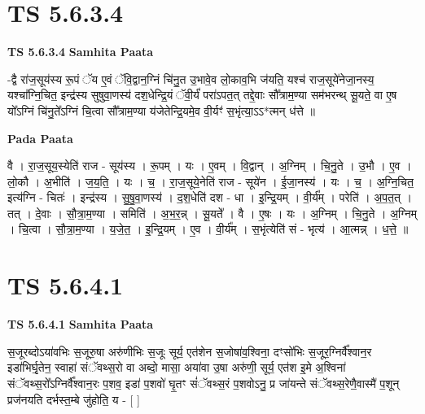 \documentclass[17pt]{extarticle}
\begin{document}

\section{ TS 5.6.3.4 }

\textbf{TS 5.6.3.4 } \newline
\textbf{Samhita Paata} \newline

-द्वै रा॑ज॒सूय॑स्य रू॒पं ॅय ए॒वं ॅवि॒द्वान॒ग्निं चि॑नु॒त उ॒भावे॒व लो॒काव॒भि ज॑यति॒ यश्च॑ राज॒सूये॑नेजा॒नस्य॒ यश्चा᳚ग्नि॒चित॒ इन्द्र॑स्य सुषुवा॒णस्य॑ दश॒धेन्द्रि॒यं ॅवी॒र्यं॑ परा॑ऽपत॒त् तद्दे॒वाः सौ᳚त्राम॒ण्या सम॑भरन्थ् सू॒यते॒ वा ए॒ष यो᳚ऽग्निं चि॑नु॒ते᳚ऽग्निं चि॒त्वा सौ᳚त्राम॒ण्या य॑जेतेन्द्रि॒यमे॒व वी॒र्यꣳ॑ स॒भृंत्या॒ऽऽ*त्मन् ध॑त्ते ॥ \newline

\textbf{Pada Paata} \newline

वै । रा॒ज॒सूय॒स्येति॑ राज - सूय॑स्य । रू॒पम् । यः । ए॒वम् । वि॒द्वान् । अ॒ग्निम् । चि॒नु॒ते । उ॒भौ । ए॒व ।   लो॒कौ । अ॒भीति॑ । ज॒य॒ति॒ । यः । च॒ । रा॒ज॒सूये॒नेति॑ राज - सूये॑न । ई॒जा॒नस्य॑ । यः । च॒ । अ॒ग्नि॒चित॒ इत्य॑ग्नि - चितः॑ । इन्द्र॑स्य । सु॒षु॒वा॒णस्य॑ । द॒श॒धेति॑ दश - धा । इ॒न्द्रि॒यम् । वी॒र्य᳚म् । परेति॑ । अ॒प॒त॒त् । तत् । दे॒वाः । सौ॒त्रा॒म॒ण्या । समिति॑ । अ॒भ॒र॒न्न् । सू॒यते᳚ । वै । ए॒षः । यः । अ॒ग्निम् । चि॒नु॒ते । अ॒ग्निम् । चि॒त्वा । सौ॒त्रा॒म॒ण्या । य॒जे॒त॒ । इ॒न्द्रि॒यम् । ए॒व । वी॒र्य᳚म् । स॒भृंत्येति॑ सं - भृत्य॑ । आ॒त्मन्न् । ध॒त्ते॒ ॥  \newline





\section{ TS 5.6.4.1 }

\textbf{TS 5.6.4.1 } \newline
\textbf{Samhita Paata} \newline

स॒जूरब्दोऽया॑वभिः स॒जूरु॒षा अरु॑णीभिः स॒जूः सूर्य॒ एत॑शेन स॒जोषा॑व॒श्विना॒ दꣳसो॑भिः स॒जूर॒ग्निर्वै᳚श्वान॒र इडा॑भिर्घृ॒तेन॒ स्वाहा॑ संॅवथ्स॒रो वा अब्दो॒ मासा॒ अया॑वा उ॒षा अरु॑णी॒ सूर्य॒ एत॑श इ॒मे अ॒श्विना॑ संॅवथ्स॒रो᳚ऽग्निर्वै᳚श्वान॒रः प॒शव॒ इडा॑ प॒शवो॑ घृ॒तꣳ सं॑ॅवथ्स॒रं प॒शवोऽनु॒ प्र जा॑यन्ते संॅवथ्स॒रेणै॒वास्मै॑ प॒शून् प्रज॑नयति दर्भस्त॒म्बे जु॑होति॒ य - [  ] \newline
\end{document}
